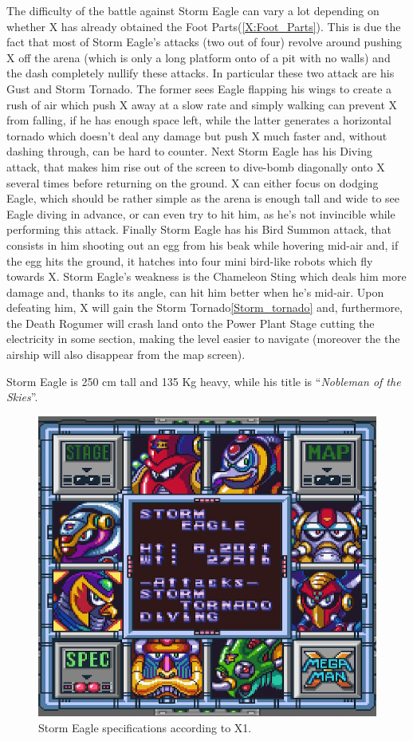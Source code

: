  The difficulty of the battle against Storm Eagle can vary a lot depending on whether X has already obtained the Foot Parts(\ref{X:Foot_Parts}). This is due the fact that most of Storm Eagle's attacks (two out of four) revolve around pushing X off the arena (which is only a long platform onto of a pit with no walls) and the dash completely nullify these attacks. In particular these two attack are his Gust\cite{wiki:Storm_Eagle} and Storm Tornado. The former sees Eagle flapping his wings to create a rush of air which push X away at a slow rate and simply walking can prevent X from falling, if he has enough space left, while the latter generates a horizontal tornado which doesn't deal any damage but push X much faster and, without dashing through, can be hard to counter. Next Storm Eagle has his Diving attack, that makes him rise out of the screen to dive-bomb diagonally onto X several times before returning on the ground. X can either focus on dodging Eagle, which should be rather simple as the arena is enough tall and wide to see Eagle diving in advance, or can even try to hit him, as he's not invincible while performing this attack. Finally Storm Eagle has his Bird Summon attack, that consists in him shooting out an egg from his beak while hovering mid-air and, if the egg hits the ground, it hatches into four mini bird-like robots which fly towards X. Storm Eagle's weakness is the Chameleon Sting which deals him more damage and, thanks to its angle, can hit him better when he's mid-air. Upon defeating him, X will gain the Storm Tornado\ref{Storm_tornado} and, furthermore, the Death Rogumer will crash land onto the Power Plant Stage cutting the electricity in some section, making the level easier to navigate (moreover the the airship will also disappear from the map screen).
 
 Storm Eagle is 250 cm tall and 135 Kg heavy, while his title is ``\textit{Nobleman of the Skies}''\cite{book:MMX_Complete_art}.
 
 \begin{figure}[h]
 	\centering
 	\includegraphics[width=0.5\linewidth]{figures/X1/Storm_eagle_specs.png}
 	\caption{Storm Eagle specifications according to X1.}
 \end{figure}
